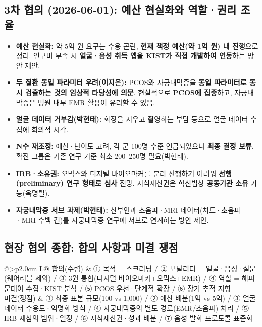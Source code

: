 \documentclass[11pt,a4paper]{article}
\begin{document}
\subsection{3차 협의 (2026-06-01): 예산 현실화와 역할·권리 조율}
\begin{itemize}
  \item \textbf{예산 현실화:} 약 5억 원 요구는 수용 곤란, \textbf{현재 책정 예산(약 1억 원) 내 진행}으로 정리. 연구비 부족 시 \textbf{얼굴·음성 취득 앱을 KIST가 직접 개발하여 연동}하는 방안 제안.
  \item \textbf{두 질환 동일 파라미터 우려(이지은):} PCOS와 자궁내막증을 \textbf{동일 파라미터로 동시 검출하는 것의 임상적 타당성에 의문}. 현실적으로 \textbf{PCOS에 집중}하고, 자궁내막증은 병원 내부 EMR 활용이 유리할 수 있음.
  \item \textbf{얼굴 데이터 거부감(박현태):} 화장을 지우고 촬영하는 부담 등으로 얼굴 데이터 수집에 회의적 시각.
  \item \textbf{N수 재조정:} 예산·난이도 고려, 각 군 100명 수준 언급되었으나 \textbf{최종 결정 보류.} 확진 그룹은 기존 연구 기준 최소 200{--}250명 필요(박현태).
  \item \textbf{IRB·소유권:} 오믹스와 디지털 바이오마커를 분리 진행하기 어려워 \textbf{선행(preliminary) 연구 형태로 심사} 전망. 지식재산권은 혁신법상 \textbf{공동기관 소유} 가능(옥명렬).
  \item \textbf{자궁내막증 서브 과제(박현태):} 산부인과 초음파·MRI 데이터(차트·초음파·MRI 수백 건)를 자궁내막증 연구에 서브로 연계하는 방안 제안.
\end{itemize}

\subsection{현장 협의 종합: 합의 사항과 미결 쟁점}
\begin{table}[h]
\centering
\footnotesize
\renewcommand{\arraystretch}{1.3}
\caption{현장 협의 종합 --- 합의(수렴) 대 미결(쟁점)}
\label{tab:summary}
\begin{tabularx}{\textwidth}{@{}>{\bfseries}p{2.0cm} L@{}}
\toprule
합의(수렴) & ① 목적 = 스크리닝 / ② 모달리티 = 얼굴·음성·설문(웨어러블 제외) / ③ 3원 통합(디지털 바이오마커+오믹스+EMR) / ④ 역할 = 해피문데이 수집·KIST 분석 / ⑤ PCOS 우선·단계적 확장 / ⑥ 장기 추적 지향 \\
\midrule
미결(쟁점) & ① 최종 표본 규모(100 vs 1{,}000) / ② 예산 배분(1억 vs 5억) / ③ 얼굴 데이터 수용도·익명화 방식 / ④ 자궁내막증의 별도 경로(EMR/초음파) 처리 / ⑤ IRB 재심의 범위·일정 / ⑥ 지식재산권·성과 배분 / ⑦ 음성 발화 프로토콜 표준화 \\
\bottomrule
\end{tabularx}
\end{table}
\end{document}
